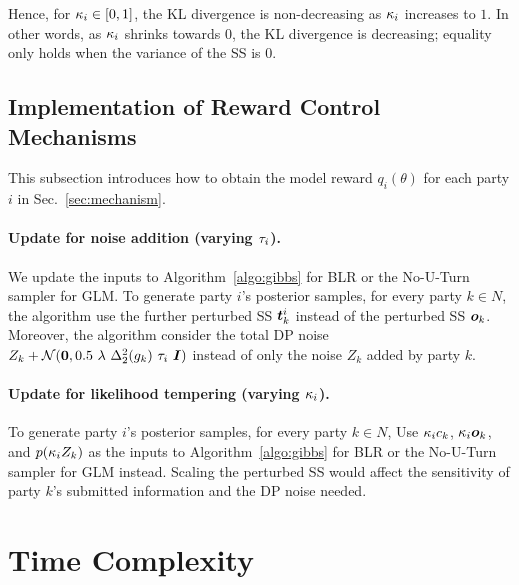\documentclass{article}
\theoremstyle{plain}
\theoremstyle{definition}
\theoremstyle{remark}
\begin{document}
Hence, for ${\kappa_i} \in [0,1]$, the KL divergence is non-decreasing as ${\kappa_i}$ increases to $1$.
In other words, as ${\kappa_i}$ shrinks towards $0$, the KL divergence is decreasing; equality only holds when the variance of the SS is $0$.


\subsection{Implementation of Reward Control Mechanisms} \label{app:subsec-noise-algo-update}
This subsection introduces how to obtain the model reward $q_i(\theta)$ for each party $i$ in Sec.~\ref{sec:mechanism}.

\paragraph{Update for noise addition (varying ${\tau_i}$).}
We update the inputs to Algorithm~\ref{algo:gibbs} for BLR or the No-U-Turn sampler for GLM. 
To generate party $i$'s posterior samples, for every party $k \in N$, 
the algorithm use the further perturbed SS ${\bm{t}}_k^i$ instead of the perturbed SS ${\bm{o}}_k$. Moreover, the algorithm consider the total DP noise $Z_k + \mathcal{N}(\vzero, 0.5\ \lambda\  \Delta_2^2(g_k)\ \addnoisei\  \mI)$ instead of only the noise $Z_k$ added by party $k$.

\paragraph{Update for likelihood tempering (varying ${\kappa_i}$).}
To generate party $i$'s posterior samples, for every party $k \in N$, Use ${\kappa_i} c_k$, ${\kappa_i} {\bm{o}}_k$, and $p({\kappa_i} Z_k)$ as the inputs to Algorithm~\ref{algo:gibbs} for BLR or the No-U-Turn \cite{hoffman2014no} sampler for GLM instead. Scaling the perturbed SS would affect the sensitivity of party $k$'s submitted information and the DP noise needed.

\section{Time Complexity}\label{app:complexity}
\end{document}
